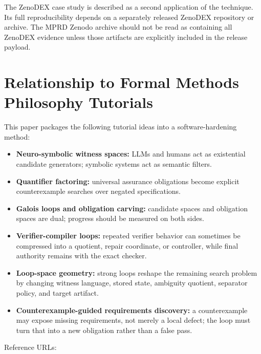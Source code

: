 \documentclass[11pt]{article}
\begin{document}
The ZenoDEX case study is described as a second application of the technique. Its full reproducibility depends on a separately released ZenoDEX repository or archive. The MPRD Zenodo archive should not be read as containing all ZenoDEX evidence unless those artifacts are explicitly included in the release payload.

\section{Relationship to Formal Methods Philosophy Tutorials}
This paper packages the following tutorial ideas into a software-hardening method:

\begin{itemize}
\item \textbf{Neuro-symbolic witness spaces:} LLMs and humans act as existential
candidate generators; symbolic systems act as semantic filters.
\item \textbf{Quantifier factoring:} universal assurance obligations become explicit
counterexample searches over negated specifications.
\item \textbf{Galois loops and obligation carving:} candidate spaces and obligation
spaces are dual; progress should be measured on both sides.
\item \textbf{Verifier-compiler loops:} repeated verifier behavior can sometimes be
compressed into a quotient, repair coordinate, or controller, while final
authority remains with the exact checker.
\item \textbf{Loop-space geometry:} strong loops reshape the remaining search problem by
changing witness language, stored state, ambiguity quotient, separator policy,
and target artifact.
\item \textbf{Counterexample-guided requirements discovery:} a counterexample may expose
missing requirements, not merely a local defect; the loop must turn that into a
new obligation rather than a false pass.
\end{itemize}
Reference URLs:
\end{document}
